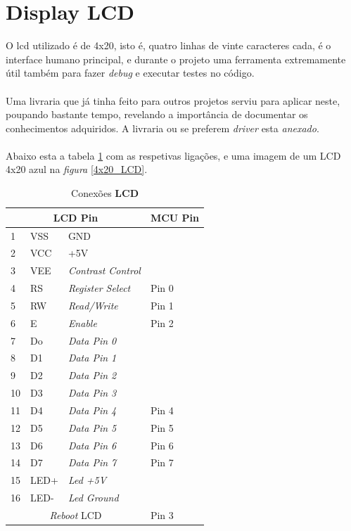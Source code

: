 \section{Display LCD}
O \ac{lcd} utilizado é de 4x20, isto é, quatro linhas de vinte caracteres cada, é o interface humano principal, e durante o projeto uma ferramenta extremamente útil também para fazer \textit{debug} e executar testes no código.
\\
\\
Uma livraria que já tinha feito para outros projetos serviu para aplicar neste, poupando bastante tempo, revelando a importância de documentar os conhecimentos adquiridos. A livraria ou se preferem \textit{driver} esta \textit{anexado}.
\\
\\
Abaixo esta a tabela \ref{LCD_connections} com as respetivas ligações, e uma imagem de um LCD 4x20 azul na \textit{figura} \ref{4x20_LCD}.
\begin{table}[H]
	\centering
	\caption{Conexões \textbf{LCD}}
	\begin{tabular}{||p{1cm} p{2cm} p{4cm} | p{1cm}||} 
		\hline
		\multicolumn{3}{||c|}{\textbf{LCD Pin}} & \multicolumn{1}{|c||}{\textbf{MCU Pin}}\\ [1ex]
		\hline
		1 & VSS & GND & \\
		2 & VCC & +5V & \\
		3 & VEE & \textit{Contrast Control} & \\
		4 & RS & \textit{Register Select} & Pin 0 \\
		5 & RW & \textit{Read/Write} & Pin 1 \\
		6 & E & \textit{Enable} & Pin 2 \\
		7 & Do & \textit{Data Pin 0} & \\
		8 & D1 & \textit{Data Pin 1} & \\
		9 & D2 & \textit{Data Pin 2} & \\
		10 & D3 & \textit{Data Pin 3} & \\
		11 & D4 & \textit{Data Pin 4} & Pin 4 \\
		12 & D5 & \textit{Data Pin 5} & Pin 5 \\
		13 & D6 & \textit{Data Pin 6} & Pin 6 \\
		14 & D7 & \textit{Data Pin 7} & Pin 7 \\
		15 & LED+ & \textit{Led +5V} &  \\
		16 & LED- & \textit{Led Ground} & \\
		\multicolumn{3}{||c|}{\textit{Reboot} LCD} & \multicolumn{1}{|l||}{Pin 3}\\ [1ex]
		\hline
	\end{tabular}	
	\label{LCD_connections}
\end{table}

